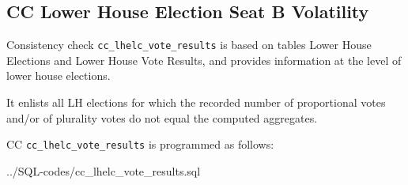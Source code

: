 \subsection{CC Lower House Election Seat B Volatility}\label{cc_lhelc_vote_results}
Consistency check \texttt{\footnotesize cc\_lhelc\_vote\_results} is based on tables Lower House Elections and Lower House Vote Results, and provides information at the level of lower house elections. 


It enlists all LH elections for which the recorded number of proportional votes and/or of plurality votes do not equal the computed aggregates.

CC \texttt{\footnotesize cc\_lhelc\_vote\_results} is programmed as follows:

%
{../SQL-codes/cc_lhelc_vote_results.sql}
